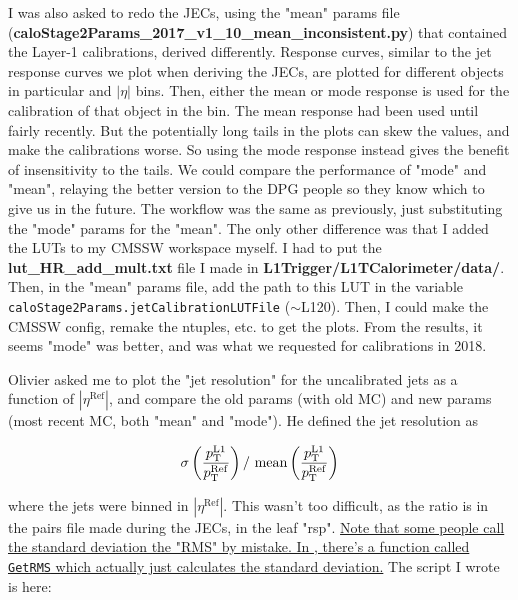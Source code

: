 I was also asked to redo the JECs, using the "mean" params file (\textbf{caloStage2Params\_2017\_v1\_10\_mean\_inconsistent.py}) that contained the Layer-1 calibrations, derived differently. Response curves, similar to the jet response curves we plot when deriving the JECs, are plotted for different objects in particular \pt and $|\eta|$ bins. Then, either the mean or mode response is used for the calibration of that object in the bin. The mean response had been used until fairly recently. But the potentially long tails in the plots can skew the values, and make the calibrations worse. So using the mode response instead gives the benefit of insensitivity to the tails. We could compare the performance of "mode" and "mean", relaying the better version to the DPG people so they know which to give us in the future. The workflow was the same as previously, just substituting the "mode" params for the "mean". The only other difference was that I added the LUTs to my CMSSW workspace myself. I had to put the \textbf{lut\_HR\_add\_mult.txt} file I made in \textbf{L1Trigger/L1TCalorimeter/data/}. Then, in the "mean" params file, add the path to this LUT in the variable \texttt{caloStage2Params.jetCalibrationLUTFile} ($\sim$L120). Then, I could make the CMSSW config, remake the ntuples, etc. to get the plots. From the results, it seems "mode" was better, and was what we requested for calibrations in 2018.

Olivier asked me to plot the "jet resolution" for the uncalibrated jets as a function of $|\eta^{\mathrm{Ref}}|$, and compare the old params (with old MC) and new params (most recent MC, both "mean" and "mode"). He defined the jet resolution as

\begin{equation}
\sigma\left( \frac{ p_{\mathrm{T}}^{\mathrm{L1}} }{ p_{\mathrm{T}}^{\mathrm{Ref}} } \right) /  \ \textrm{mean} \left( \frac{ p_{\mathrm{T}}^{\mathrm{L1}} }{ p_{\mathrm{T}}^{\mathrm{Ref}} } \right)
\end{equation}

where the jets were binned in $|\eta^{\mathrm{Ref}}|$. This wasn't too difficult, as the \pt ratio is in the pairs file made during the JECs, in the leaf "rsp". \uline{Note that some people call the standard deviation the "RMS" by mistake. In \ROOT, there's a function called \texttt{GetRMS} which actually just calculates the standard deviation.} The script I wrote is here:



